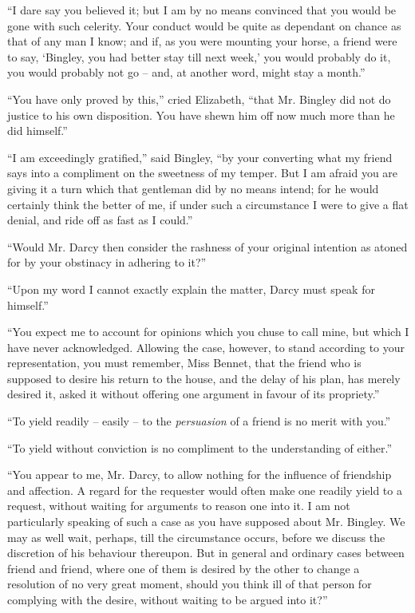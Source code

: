 “I dare say you believed it; but I am by no means
convinced that you would be gone with such celerity.
Your conduct would be quite as dependant on chance as
that of any man I know; and if, as you were mounting
your horse, a friend were to say, ‘Bingley, you had better
stay till next week,’ you would probably do it, you would
probably not go -- and, at another word, might stay a
month.”

“You have only proved by this,” cried Elizabeth,
“that Mr. Bingley did not do justice to his own disposition.
You have shewn him off now much more than
he did himself.”

“I am exceedingly gratified,” said Bingley, “by your
converting what my friend says into a compliment on the
sweetness of my temper. But I am afraid you are giving
it a turn which that gentleman did by no means intend;
for he would certainly think the better of me, if under
such a circumstance I were to give a flat denial, and ride
off as fast as I could.”

“Would Mr. Darcy then consider the rashness of your
original intention as atoned for by your obstinacy in
adhering to it?”

“Upon my word I cannot exactly explain the matter,
Darcy must speak for himself.”

“You expect me to account for opinions which you
chuse to call mine, but which I have never acknowledged.
Allowing the case, however, to stand according to your
representation, you must remember, Miss Bennet, that the
friend who is supposed to desire his return to the house,
and the delay of his plan, has merely desired it, asked it
without offering one argument in favour of its propriety.”

“To yield readily -- easily -- to the \textit{persuasion} of a friend
is no merit with you.”

“To yield without conviction is no compliment to the
understanding of either.”

“You appear to me, Mr. Darcy, to allow nothing for
the influence of friendship and affection. A regard for
the requester would often make one readily yield to a
request, without waiting for arguments to reason one into
it. I am not particularly speaking of such a case as you
have supposed about Mr. Bingley. We may as well wait,
perhaps, till the circumstance occurs, before we discuss
the discretion of his behaviour thereupon. But in general
and ordinary cases between friend and friend, where one
of them is desired by the other to change a resolution
of no very great moment, should you think ill of that person
for complying with the desire, without waiting to be
argued into it?”

